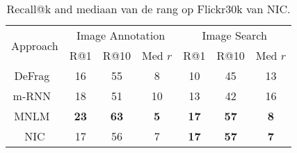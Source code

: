 \begin{table}
	\centering
	\begin{small}
		\setlength{\tabcolsep}{3pt}
		\begin{tabular}{|c|ccc|ccc|}
			\hline
			\multirow{2}{*}{Approach} & \multicolumn{3}{c|}{Image Annotation} & \multicolumn{3}{c|}{Image Search} \\
			& R@1 & R@10 & Med $r$ &  R@1 & R@10 & Med $r$ \\
			\hline
			\hline
			DeFrag~\cite{karpathy2014deep} & 16 & 55 & 8             &    10 & 45 & 13  \\
			m-RNN~\cite{baidu2014}         &  18 & 51 & 10               &  13 & 42 & 16\\
			MNLM~\cite{kiros2014}        &  \textbf{23}   & \textbf{63} & \textbf{5}        &  \textbf{17} & \textbf{57} & \textbf{8}   \\
			\hline
			NIC                            &  17 & 56  & 7               &    \textbf{17} & \textbf{57} & \textbf{7} \\
			\hline
		\end{tabular}
	\end{small}
	\caption{Recall@k and mediaan van de rang op Flickr30k van NIC.\label{tab:recall@1030k}}
	\label{table:recall}
\end{table}




